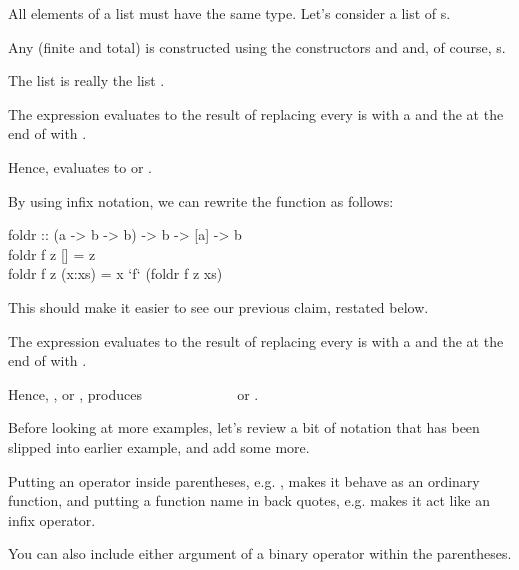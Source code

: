 \documentclass{seminar}
\begin{document}
\begin{slide}
All elements of a list must have the same type.  Let's consider a list of
s.

Any (finite and total) \textcd{[Int]} is constructed using
the constructors \textcd{[]} and \textcd{:} and, of course, s.

The list \textcdlr{[1,2,3,4]} is really the list
.

The expression  evaluates to the result
of replacing every \textcd{:} is  with a \textcd{$\oplus$} and
the \textcd{[]} at the end of  with .

Hence,  evaluates to
\newline
{} or .


\newslide

By using infix notation, we can rewrite the
 function as follows:
\begin{code}
foldr            :: (a -> b -> b) -> b -> [a] -> b\\
foldr f z []     =  z\\
foldr f z (x:xs) =  x `f` (foldr f z xs)
\end{code}

This should make it easier to see our previous claim, restated below.

The expression  evaluates to the result
of replacing every \textcd{:} is  with a \textcd{$\oplus$} and
the \textcd{[]} at the end of  with .

Hence,
\newline
{}, or
\newline
{}, produces
\newline
\verb|            | or .

\newslide

Before looking at more examples,
let's review a bit of notation that has been slipped into earlier example,
and add some more.

Putting an operator inside parentheses, e.g. \textcd{(+)}, makes it
behave as an ordinary function, and putting a function name in back
quotes, e.g.  makes it act like an infix operator.

You can also include either argument of a binary operator within the
parentheses.


\end{slide}
\end{document}

